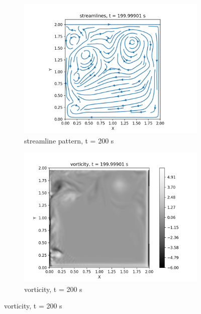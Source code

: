 \begin{figure}[!h]
\begin{subfigure}{0.5\textwidth}
       \centering
        \includegraphics[scale =0.5]{supporting_documents/contours/streamlines/streamlines_0000000200.png}
        \caption{streamline pattern, t = 200 s}
    \end{subfigure}
   \hfill
    \begin{subfigure}{0.5\textwidth}
       \centering
        \includegraphics[scale =0.5]{supporting_documents/contours/vorticity/vorticity_0000000200.png}
        \caption{vorticity, t = 200 s}
    \end{subfigure}
\end{figure}
